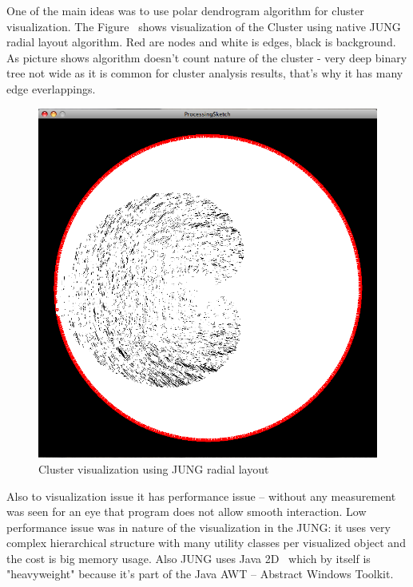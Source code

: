 \documentclass[a4paper,oneside]{article}
\begin{document}
One of the main ideas was to use polar dendrogram algorithm for cluster visualization. The Figure~\cite{JUNG_radial_layout} shows visualization of the Cluster using native JUNG radial layout algorithm. Red are nodes and white is edges, black is background. As picture shows algorithm doesn't count nature of the cluster - very deep binary tree not wide as it is common for cluster analysis results, that's why it has many edge everlappings.


\begin{figure}
\begin{center}
	\includegraphics[scale=0.3]{pictures/using_JUNG_radial.png}
	\caption{Cluster visualization using JUNG radial layout}
	\label{JUNG_radial_layout}
\end{center}
\end{figure}


Also to visualization issue it has performance issue -- without any measurement was seen for an eye that program does not allow smooth interaction. Low performance issue was in nature of the visualization in the JUNG: it uses very complex hierarchical structure with many utility classes per visualized object and the cost is big memory usage. Also JUNG uses Java 2D~\cite{JAVA_2D} which by itself is "heavyweight" because it's part of the Java AWT -- Abstract Windows Toolkit.
\end{document}
